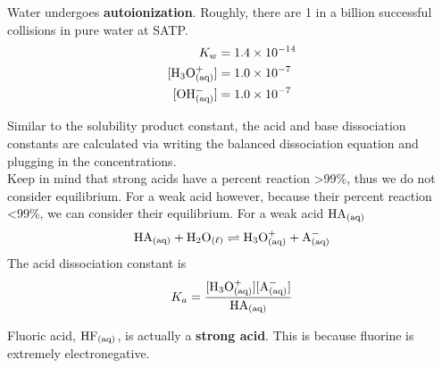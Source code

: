 Water undergoes \textbf{autoionization}. Roughly, there are 1 in a billion successful collisions in pure 
water at SATP.
\begin{align*}
    K_w&=1.4\times10^{-14}\\
    [\ch{H3O^+_{(aq)}}]&=1.0\times10^{-7}\\
    [\ch{OH^-_{(aq)}}]&=1.0\times10^{-7}\\
\end{align*}

Similar to the solubility product constant, the acid and base dissociation constants are calculated
via writing the balanced dissociation equation and plugging in the concentrations.\\

Keep in mind that strong acids have a percent reaction >99\%, thus we do not consider equilibrium.
For a weak acid however, because their percent reaction <99\%, we can consider their equilibrium.
For a weak acid $\ch{HA_{(aq)}}$
\[
    \ch{HA_{(aq)}}+\ch{H2O_{(\ell)}}\rightleftharpoons \ch{H3O^+_{(aq)}}+\ch{A^-_{(aq)}}
\]
The acid dissociation constant is
\[
    K_a=\frac{[\ch{H3O^+_{(aq)}}][\ch{A^-_{(aq)}}]}{\ch{HA_{(aq)}}}
\]

\begin{important}
    Fluoric acid, $\ch{HF_{(aq)}}$, is actually a \textbf{strong acid}. This is because fluorine
    is extremely electronegative.
\end{important}

